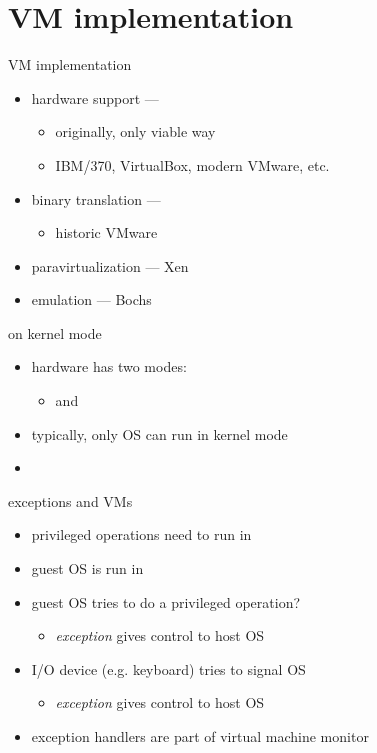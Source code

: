 \section{VM implementation}

\begin{frame}{VM implementation}
    \begin{itemize}
    \item hardware support --- 
        \begin{itemize}
        \item originally, only viable way
        \item IBM/370, VirtualBox, modern VMware, etc.
        \end{itemize}
    \item binary translation --- 
        \begin{itemize}
        \item historic VMware
        \end{itemize}
    \item paravirtualization --- Xen
    \item emulation --- Bochs
    \end{itemize}
\end{frame}

\begin{frame}{on kernel mode}
    \begin{itemize}
    \item hardware has two modes:
        \begin{itemize}
        \item {} and 
        \end{itemize}
    \item typically, only OS can run in kernel mode
    \item {}
    \end{itemize}
\end{frame}

\begin{frame}{exceptions and VMs}
    \begin{itemize}
    \item privileged operations need to run in 
    \item guest OS is run in 
    \item guest OS tries to do a privileged operation? 
        \begin{itemize}
        \item \textit{exception} gives control to host OS
        \end{itemize}
    \item I/O device (e.g. keyboard) tries to signal OS
        \begin{itemize}
        \item \textit{exception} gives control to host OS
        \end{itemize}
    \item exception handlers are part of virtual machine monitor
    \end{itemize}
\end{frame}

